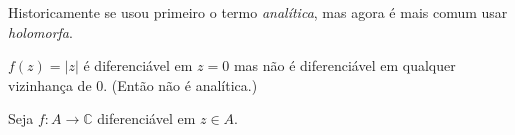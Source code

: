 \begin{remark}\leavevmode
Historicamente se usou primeiro o termo \textit{analítica}, mas agora é mais comum usar \textit{holomorfa}.
\end{remark}

\begin{example}\leavevmode
\(f(z)=|z|\) é diferenciável em \(z=0\) mas não é diferenciável em qualquer vizinhança de 0. (Então não é analítica.)
\end{example}

Seja \(f:A \to \mathbb{C}\) diferenciável em \(z \in A\).


